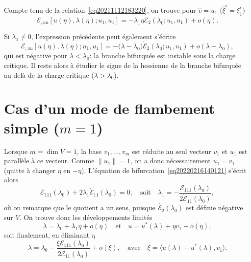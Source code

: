 \documentclass[12pt, final]{amsart}
\begin{document}
Compte-tenu de la relation~\eqref{eq20211112183220}, on trouve pour
\(\hat{v}=u_1\) (\(\hat{\xi }^i=\xi _1^i\))
\begin{equation}
  \mathcal E_{,uu}[u(\eta ), \lambda (\eta ); u_1, u_1]=-\lambda _1\eta \dot{\mathcal E}_2(\lambda _0; u_1, u_1)+o(\eta ).
\end{equation}

Si \(\lambda _1\neq0\), l'expression précédente peut également s'écrire
\begin{equation}
  \mathcal E_{,uu}[u(\eta ), \lambda (\eta ); u_1, u_1]=-\bigl(\lambda -\lambda _0\bigr)\dot{\mathcal E}_2(\lambda _0; u_1, u_1)+o(\lambda -\lambda _0),
\end{equation}
qui est négative pour \(\lambda <\lambda _0\): la branche bifurquée est instable sous la
charge critique. Il reste alors à étudier le signe de la hessienne de la
branche bifurquée au-delà de la charge critique (\(\lambda >\lambda _0\)).

\section{Cas d'un mode de flambement simple (\(m=1\))}

Lorsque \(m=\dim V=1\), la base \(v_1, \ldots, v_m\) est réduite au seul vecteur
\(v_1\) et \(u_1\) est parallèle à ce vecteur. Comme \(\lVert u_1\rVert=1\), on a
donc nécessairement \(u_1=v_1\) (quitte à changer \(\eta \) en \(-\eta \)). L'équation de
bifurcation~\eqref{eq20220216140121} s'écrit alors
\begin{equation}
  \label{eq20220203144712}
  \mathcal E_{111}(\lambda _0)+2\lambda _1\dot{\mathcal E}_{11}(\lambda _0)=0,
  \quad\text{soit}\quad
  \lambda _1=-\frac{\mathcal E_{111}(\lambda _0)}{2\dot{\mathcal E}_{11}(\lambda _0)},
\end{equation}
où on remarque que le quotient a un sens, puisque \(\dot{\mathcal E_2}(\lambda _0)\) est définie
négative sur \(V\). On trouve donc les développements limités
\begin{equation}
  \lambda =\lambda _0+\lambda _1\eta +o(\eta )
  \quad\text{et}\quad
  u=u^*(\lambda )+\eta v_1+o(\eta ),
\end{equation}
soit finalement, en éliminant \(\eta \)
\begin{equation}
  \lambda =\lambda _0-\frac{\xi \mathcal E_{111}(\lambda _0)}{2\dot{\mathcal E}_{11}(\lambda _0)}+o(\xi ),
  \quad\text{avec}\quad
  \xi =\langle u(\lambda )-u^*(\lambda ), v_1\rangle .
\end{equation}
\end{document}
